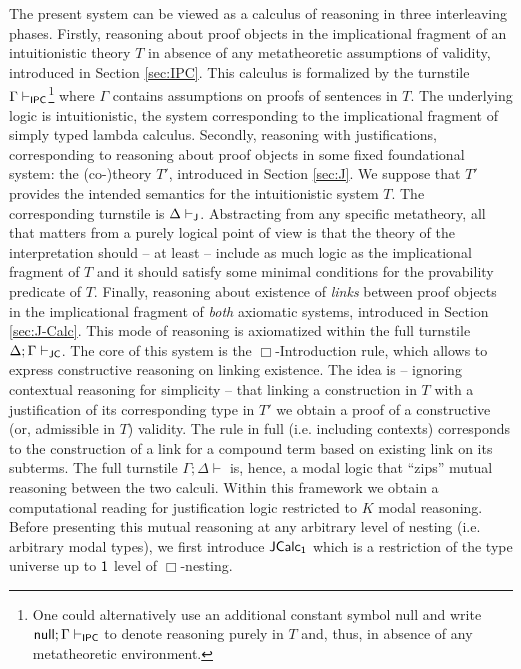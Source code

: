 \documentclass[11pt]{entcs}
\begin{document}
The present system can be viewed as a calculus of reasoning in three interleaving phases.
%
Firstly, reasoning about proof objects in the implicational fragment of an intuitionistic theory $T$ in absence of any metatheoretic assumptions of validity, introduced in Section \ref{sec:IPC}. This calculus is formalized by the turnstile $\Gamma\vdash_{\sf IPC}$\footnote{One could alternatively use an additional constant symbol {\sf null} and write ${\sf null};\Gamma\vdash_{\sf IPC}$ to denote reasoning  purely in $T$ and, thus, in absence of any metatheoretic environment.}  where $\Gamma$ contains assumptions on proofs of sentences in $T$. The underlying logic is intuitionistic, the system corresponding to the implicational fragment of  simply typed lambda calculus.
%
Secondly, reasoning with justifications, corresponding to reasoning  about proof objects in some fixed foundational system: the (co-)theory $T'$, introduced in Section \ref{sec:J}. We suppose that $T'$ provides the intended semantics for the intuitionistic system $T$. The corresponding turnstile is $\Delta \vdash_{\sf J}$. Abstracting from any specific metatheory, all that matters  from a  purely logical point of view is that the theory of the interpretation should -- at least -- include as much logic as the implicational fragment of $T$ and it should satisfy some minimal conditions for the  provability predicate  of $T$. 
%
Finally, reasoning  about existence of \textit{links} between proof objects in the implicational fragment of \textit{both} axiomatic systems, introduced in Section \ref{sec:J-Calc}. This mode of reasoning is axiomatized within the full turnstile $\Delta;\Gamma\vdash_{\sf JC}$. The core of this system is  the $\Box$-Introduction rule, which allows to express constructive reasoning on linking existence. The idea is -- ignoring contextual reasoning for simplicity -- that linking a construction in $T$ with a justification of its corresponding type in $T'$ we obtain a proof of a constructive (or, admissible in $T$) validity. The rule in full (i.e. including contexts) corresponds to the construction of a link for a compound term based on existing link on its subterms.   
The full turnstile $\Gamma; \Delta\vdash$ is, hence, a modal logic that ``zips'' mutual reasoning between the two calculi. Within this framework we obtain a computational reading for justification logic restricted to $K$ modal reasoning. Before presenting this mutual reasoning at any arbitrary level of nesting (i.e. arbitrary modal types), we first introduce ${\sf JCalc_1}$ which is a restriction of the type universe up to ${\sf 1}$ level of $\Box$-nesting.
\end{document}
